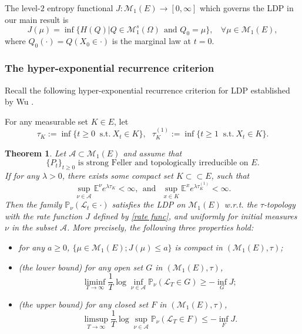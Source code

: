 \documentclass[12pt,a4paper]{article}
\newtheorem{theorem}{Theorem}[section]
\theoremstyle{definition}
\theoremstyle{remark}
\numberwithin{equation}{section}
\newcommand{\E}{\mathbb{E}}            %
\begin{document}
{The level-$2$ entropy functional $J: \mathcal M_1(E)\rightarrow [0, \infty]$ which governs the LDP in our main result is
\begin{equation}\label{rate func}
J(\mu)=\inf\{H(Q)| Q\in \mathcal M_1^s(\Omega) \  \ \text{and } Q_0=\mu\}, \ \ \ \ \forall \mu\in \mathcal M_1(E),
\end{equation}
where $Q_0(\cdot)=Q(X_0\in \cdot)$ is the marginal law at $t=0$.



\subsubsection{The hyper-exponential recurrence criterion}
   Recall the following hyper-exponential recurrence criterion for LDP established by Wu \cite[Theorem 2.1]{Wu01}.

\vskip0.3cm
For  any measurable set $K\in E$, let
\begin{equation}\label{stopping time}
\tau_K:=\inf\{t\ge0 \ \text{ s.t.}\   X_t\in K\},\ \ \ \tau_K^{(1)}:=\inf\{t\ge1\  \text{ s.t.}\ X_t\in K\}.
\end{equation}

\begin{theorem}\cite{Wu01}\label{thm Wu}
Let $\mathcal A\subset \mathcal M_1(E)$ and assume that
\begin{equation*}\label{condition 1}
\{P_t\}_{t\ge0} \text{ is strong Feller and topologically irreducible on  } E.
\end{equation*}
If for any $\lambda>0$, there exists some compact set $K\subset \subset E$, such that
\begin{equation}\label{condition 2}
\sup_{\nu\in\mathcal A}\E^{\nu}e^{\lambda\tau_K}<\infty, \ \  \text{and} \ \ \
\sup_{x\in K}\E^{x}e^{\lambda\tau_K^{(1)}}<\infty.
\end{equation}
 Then the family $\mathbb P_{\nu}(\mathcal L_t\in\cdot)$ satisfies the LDP on $\mathcal M_1(E)$ w.r.t. the $\tau$-topology with the rate function $J$ defined by \eqref{rate func}, and uniformly for initial measures $\nu$ in the subset $\mathcal A$. More precisely, the following three properties hold:
\begin{itemize}
  \item[(a1)] for any $a\ge0$, $\{\mu\in \mathcal M_1(E); J(\mu)\le a \}$ is compact in  $(\mathcal M_1(E),\tau)$;
  \item[(a2)] (the lower bound) for any open set $G$ in $(\mathcal M_1(E), \tau)$,
   $$
   \liminf_{T\rightarrow \infty}\frac1T\log\inf_{\nu\in\mathcal A}\mathbb P_{\nu}(\mathcal L_T\in G)\ge -\inf_G J;
   $$
  \item[(a3)](the upper bound) for any  closed set $F$ in $(\mathcal M_1(E), \tau)$,
   $$
   \limsup_{T\rightarrow \infty}\frac1T\log\sup_{\nu\in\mathcal A}\mathbb P_{\nu}(\mathcal L_T\in F)\le -\inf_F J.
   $$
\end{itemize}



\end{theorem}}
\end{document}
